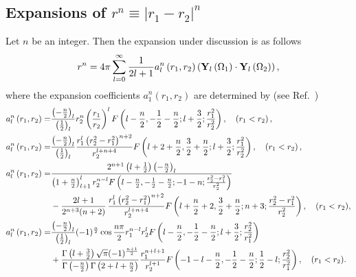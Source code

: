\subsection{Expansions of $r^{n} \equiv\left|r_{1}-r_{2}\right|^{n}$}\label{sec:5.17.5}
Let $n$ be an integer. Then the expansion under discussion is as follows
\begin{equation}
r^{n}=4 \pi \sum_{l=0}^{\infty} \frac{1}{2 l+1} a_{l}^{n}\left(r_{1}, r_{2}\right)\left(\mathbf{Y}_{l}\left(\Omega_{1}\right) \cdot \mathbf{Y}_{l}\left(\Omega_{2}\right)\right), \label{eq:5:17:26}
\end{equation}
where the expansion coefficients $a_{1}^{n}\left(r_{1}, r_{2}\right)$ are determined by (see Ref.~\cite{ref097})
\begin{align}
a_{l}^{n}\left(r_{1}, r_{2}\right)= & \frac{\left(-\frac{n}{2}\right)_{l}}{\left(\frac{1}{2}\right)_{l}} r_{2}^{n}\left(\frac{r_{1}}{r_{2}}\right)^{l} F\left(l-\frac{n}{2},-\frac{1}{2}-\frac{n}{2} ; l+\frac{3}{2} ; \frac{r_{1}^{2}}{r_{2}^{2}}\right),\quad \left(r_{1}<r_{2}\right),  \label{eq:5:17:27}\\
a_{l}^{n}\left(r_{1}, r_{2}\right)= & \frac{\left(-\frac{n}{2}\right)_{l}}{\left(\frac{1}{2}\right)_{l}} \frac{r_{1}^{l}\left(r_{2}^{2}-r_{1}^{2}\right)^{n+2}}{r_{2}^{l+n+4}} F\left(l+2+\frac{n}{2}, \frac{3}{2}+\frac{n}{2} ; l+\frac{3}{2} ; \frac{r_{1}^{2}}{r_{2}^{2}}\right),\quad\left(r_{1}<r_{2}\right),  \label{eq:5:17:28}\\
a_{l}^{n}\left(r_{1}, r_{2}\right)= & \frac{2^{n+1}\left(l+\frac{1}{2}\right)\left(-\frac{n}{2}\right)_{l}}{\left(1+\frac{n}{2}\right)_{l+1}^{l} r_{2}^{n-l} F\left(l-\frac{n}{2},-\frac{1}{2}-\frac{n}{2} ;-1-n ; \frac{r_{2}^{2}-r_{1}^{2}}{r_{2}^{2}}\right)}  \notag\\
& -\frac{2 l+1}{2^{n+3}(n+2)} \, \frac{r_{1}^{l}\left(r_{2}^{2}-r_{1}^{2}\right)^{n+2}}{r_{2}^{l+n+4}} F\left(l+\frac{n}{2}+2, \frac{3}{2}+\frac{n}{2} ; n+3 ; \frac{r_{2}^{2}-r_{1}^{2}}{r_{2}^{2}}\right),\quad (r_{1}<r_{2}) , \label{eq:5:17:29}\\
a_{l}^{n}\left(r_{1}, r_{2}\right)= & \frac{\left(-\frac{n}{2}\right)_{l}}{\left(\frac{1}{2}\right)_{l}}
(-1)^{\frac{n}{2}} \cos \frac{n \pi}{2} r_{1}^{n-l} r_{2}^{l} F\left(l-\frac{n}{2},-\frac{1}{2}-\frac{n}{2} ; l+\frac{3}{2} ; \frac{r_{2}^{2}}{r_{1}^{2}}\right)  \notag\\
& +\frac{\Gamma\left(l+\frac{3}{2}\right) \sqrt{\pi}(-1)^{\frac{n+1}{2}}}{\Gamma\left(-\frac{n}{2}\right) \Gamma\left(2+l+\frac{n}{2}\right)} \frac{r_{1}^{n+l+1}}{r_{2}^{l+1}} F\left(-1-l-\frac{n}{2},-\frac{1}{2}-\frac{n}{2} ; \frac{1}{2}-l ; \frac{r_{2}^{2}}{r_{1}^{2}}\right),\quad (r_{1}<r_{2}) .
\label{eq:5:17:30}
\end{align}
